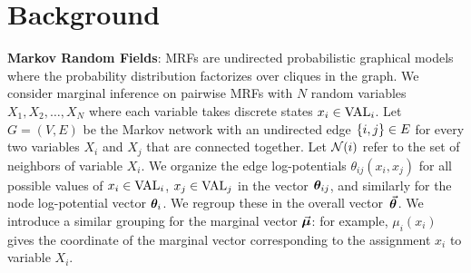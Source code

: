 \vspace{-2mm}
\section{Background}
\vspace{-3mm}

{\bf Markov Random Fields}:
MRFs are undirected probabilistic graphical models 
where the probability distribution factorizes over cliques in the graph.
We consider marginal inference on pairwise MRFs with $N$ random variables $X_1,X_2,\ldots,X_N$
where each variable takes discrete states $x_i\in \textrm{VAL}_i$. Let $G=(V,E)$ be the Markov 
network with an undirected edge $\{i,j\}\in E$ for every two 
variables $X_i$ and $X_j$ that are connected together. Let $\mathcal{N}(i)$ refer to the 
set of neighbors of variable $X_i$. We organize the edge log-potentials $\theta_{ij}(x_i, x_j)$
for all possible values of $x_i \in \textrm{VAL}_i$, $x_j \in \textrm{VAL}_j$ in the vector $\bm{\theta}_{ij}$,
and similarly for the node log-potential vector $\bm{\theta}_i$. We regroup these in the overall
vector~$\vec{\bm{\theta}}$. We introduce a similar grouping for the marginal vector $\vec{\bm{\mu}}$:
for example, $\mu_i(x_i)$ gives the coordinate of the marginal vector corresponding
to the assignment $x_i$ to variable $X_i$.

